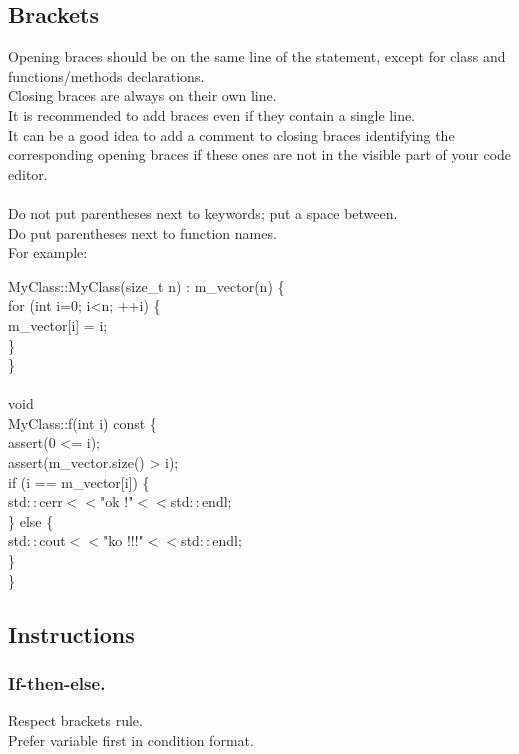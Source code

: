 \subsection{Brackets}
Opening braces should be on the same line of the statement, except for
class and functions/methods declarations.\\
Closing braces are always on their own line.\\
It is recommended to add braces even if they contain a single line.\\
It can be a good idea to add a comment to closing braces identifying
the corresponding opening braces if these ones are not in the visible
part of your code editor.\\
\ \\
Do not put parentheses next to keywords; put a space between.\\
Do put parentheses next to function names.\\

For example:
\begin{algorithm}[H]
MyClass::MyClass(size\_t n) : m\_vector(n) \{ \\
for (int i=0; i<n; ++i) \{ \\
m\_vector[i] = i; \\
\} \\
\} \\
 \\
void \\
MyClass::f(int i) const \{ \\
assert(0 <= i); \\
assert(m\_vector.size() > i); \\
if (i == m\_vector[i]) \{ \\
std$::$cerr$<<$"ok !"$<<$std$::$endl; \\
\} else \{ \\
std$::$cout$<<$"ko !!!"$<<$std$::$endl; \\
\} \\
\}
\end{algorithm}

\subsection{Instructions}
\subsubsection{If-then-else.}
Respect brackets rule.\\
Prefer variable first in condition format.\\

